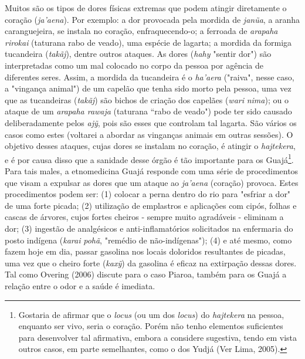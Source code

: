 Muitos são os tipos de dores físicas extremas que podem atingir
diretamente o coração (\emph{ja'aena}). Por exemplo: a dor provocada
pela mordida de \emph{janũa}, a aranha caranguejeira, se instala no
coração, enfraquecendo-o; a ferroada de \emph{arapaha rirokai­}
(taturana rabo de veado), uma espécie de lagarta; a mordida da formiga
tucandeira (\emph{takãj}), dentre outros ataques. As dores (\emph{hahy}
"sentir dor") são interpretadas como um mal colocado no corpo da pessoa
por agência de diferentes seres. Assim, a mordida da tucandeira é o
\emph{ha'aera} ("raiva", nesse caso, a "vingança animal") de um capelão
que tenha sido morto pela pessoa, uma vez que as tucandeiras
(\emph{takãj}) são bichos de criação dos capelães (\emph{wari}
\emph{nima}); ou o ataque de um \emph{arapaha rawaja} (taturana ``rabo
de veado") pode ter sido causado deliberadamente pelos \emph{ajỹ}, pois
são esses que controlam tal lagarta. São vários os casos como estes
(voltarei a abordar as vinganças animais em outras sessões). O objetivo
desses ataques, cujas dores se instalam no coração, é atingir o
\emph{hajtekera}, e é por causa disso que a sanidade desse órgão é tão
importante para os Guajá\footnote{Gostaria de afirmar que o \emph{locus}
  (ou um dos \emph{locus}) do \emph{hajtekera} na pessoa, enquanto ser
  vivo, seria o coração. Porém não tenho elementos suficientes para
  desenvolver tal afirmativa, embora a considere sugestiva, tendo em
  vista outros casos, em parte semelhantes, como o dos Yudjá (Ver Lima,
  2005).}. Para tais males, a etnomedicina Guajá responde com uma série
de procedimentos que visam a expulsar as dores que um ataque ao
\emph{ja'aena} (coração) provoca. Estes procedimentos podem ser: (1)
colocar a perna dentro do rio para "esfriar a dor" de uma forte picada;
(2) utilização de emplastros e aplicações com cipós, folhas e cascas de
árvores, cujos fortes cheiros - sempre muito agradáveis - eliminam a
dor; (3) ingestão de analgésicos e anti-inflamatórios solicitados na
enfermaria do posto indígena (\emph{karai} \emph{pohã}, "remédio de
não-indígenas"); (4) e até mesmo, como fazem hoje em dia, passar
gasolina nos locais doloridos resultantes de picadas, uma vez que o
cheiro forte (\emph{kaxỹ}) da gasolina é eficaz na extirpação dessas
dores. Tal como Overing (2006) discute para o caso Piaroa, também para
os Guajá a relação entre o odor e a saúde é imediata.

